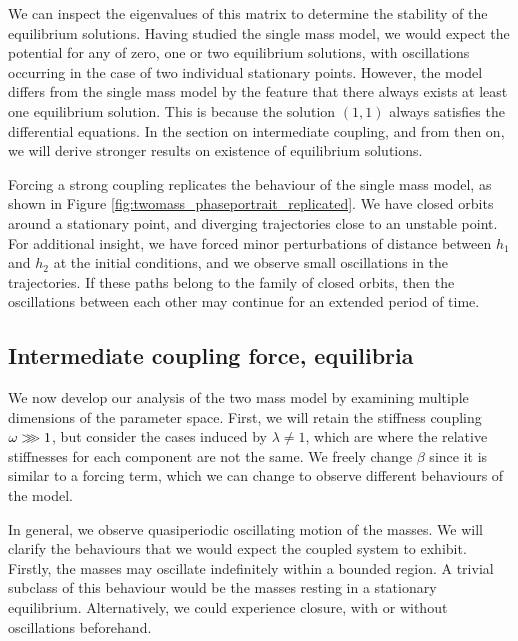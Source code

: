 We can inspect the eigenvalues of this matrix to determine the stability of the equilibrium solutions.
Having studied the single mass model, we would expect the potential for any of zero, one or two equilibrium solutions, with oscillations occurring in the case of two individual stationary points.
However, the model differs from the single mass model by the feature that there always exists at least one equilibrium solution.
This is because the solution \((1,1)\) always satisfies the differential equations.
In the section on intermediate coupling, and from then on,
we will derive stronger results on existence of equilibrium solutions.

Forcing a strong coupling replicates the behaviour of the single mass model, as shown in Figure \ref{fig:twomass_phaseportrait_replicated}.
We have closed orbits around a stationary point,
and diverging trajectories close to an unstable point.
For additional insight,
we have forced minor perturbations of distance between $h_1$ and $h_2$ at the initial conditions,
and we observe small oscillations in the trajectories.
If these paths belong to the family of closed orbits, then the oscillations between each other may continue for an extended period of time.


\subsection{Intermediate coupling force, equilibria}

We now develop our analysis of the two mass model by examining multiple dimensions of the parameter space.
First, we will retain the stiffness coupling \(\omega \gggtr 1\),
but consider the cases induced by \(\lambda \ne 1\), which are where the relative stiffnesses for each component are not the same.
We freely change \(\beta\) since it is similar to a forcing term, which we can change to observe different behaviours of the model.


In general, we observe quasiperiodic oscillating motion of the masses.
We will clarify the behaviours that we would expect the coupled system to exhibit.
Firstly, the masses may oscillate indefinitely within a bounded region.
A trivial subclass of this behaviour would be the masses resting in a stationary equilibrium.
Alternatively, we could experience closure, with or without oscillations beforehand.

